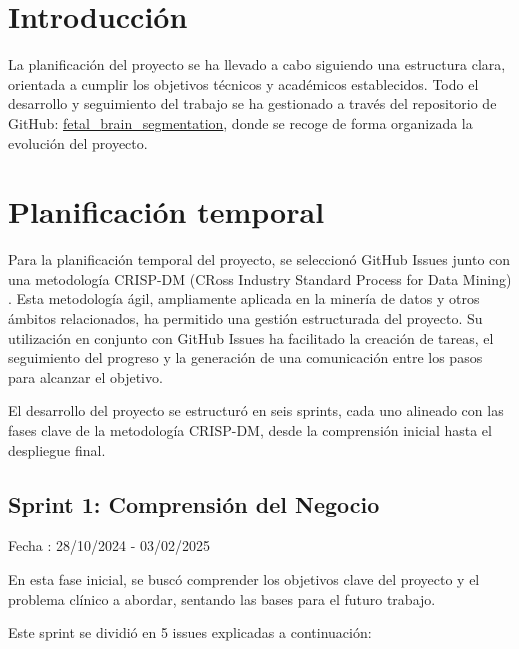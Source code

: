 
\section{Introducción}

La planificación del proyecto se ha llevado a cabo siguiendo una estructura clara, orientada a cumplir los objetivos técnicos y académicos establecidos. Todo el desarrollo y seguimiento del trabajo se ha gestionado a través del repositorio de GitHub: \href{https://github.com/eirarodriguez/fetal_brain_segmentation} {fetal\_brain\_segmentation}, donde se recoge de forma organizada la evolución del proyecto.

\section{Planificación temporal}

Para la planificación temporal del proyecto, se seleccionó GitHub Issues junto con una metodología  CRISP-DM (CRoss Industry Standard Process for Data Mining) \cite{crispdm2021}. Esta metodología ágil, ampliamente aplicada en la minería de datos y otros ámbitos relacionados, ha permitido una gestión estructurada del proyecto. Su utilización en conjunto con GitHub Issues ha facilitado la creación de tareas, el seguimiento del progreso y la generación de una comunicación entre los pasos para alcanzar el objetivo.

El desarrollo del proyecto se estructuró en seis sprints, cada uno alineado con las fases clave de la metodología CRISP-DM, desde la comprensión inicial hasta el despliegue final.

\subsection{Sprint 1: Comprensión del Negocio}

Fecha : 28/10/2024 - 03/02/2025

En esta fase inicial, se buscó comprender los objetivos clave del proyecto y el problema clínico a abordar, sentando las bases para el futuro trabajo.

Este sprint se dividió en 5 issues explicadas a continuación:

